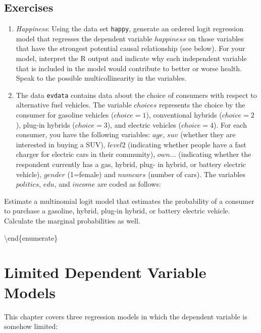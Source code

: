 \documentclass[
]{article}
\begin{document}
\hypertarget{exercises-3}{%
\subsection{Exercises}\label{exercises-3}}

\begin{enumerate}
\def\labelenumi{\arabic{enumi}.}
\item
  \emph{Happiness}: Using the data set \texttt{happy}, generate an ordered logit regression model that regresses the dependent variable \(happiness\) on those variables that have the strongest potential causal relationship (see below). For your model, interpret the R output and indicate why each independent variable that is included in the model would contribute to better or worse health. Speak to the possible multicollinearity in the variables.
\item
  The data \texttt{evdata} contains data about the choice of consumers with respect to alternative fuel vehicles. The variable \(choices\) represents the choice by the consumer for gasoline vehicles (\(choice = 1\)), conventional hybrids (\(choice = 2\)), plug-in hybrids (\(choice = 3\)), and electric vehicles (\(choice = 4\)). For each consumer, you have the following variables: \(age\), \(suv\) (whether they are interested in buying a SUV), \(level2\) (indicating whether people have a fast charger for electric cars in their community), \(own \dots\) (indicating whether the respondent currently has a gas, hybrid, plug- in hybrid, or battery electric vehicle), \(gender\) (1=female) and \(numcars\) (number of cars). The variables \(politics\), \(edu\), and \(income\) are coded as follows:
\end{enumerate}

Estimate a multinomial logit model that estimates the probability of a consumer to purchase a gasoline, hybrid, plug-in hybrid, or battery electric vehicle. Calculate the marginal probabilities as well.

\textbackslash end\{enumerate\}

\hypertarget{limited-dependent-variable-models}{%
\section{Limited Dependent Variable Models}\label{limited-dependent-variable-models}}

This chapter covers three regression models in which the dependent variable is somehow limited:
\end{document}
